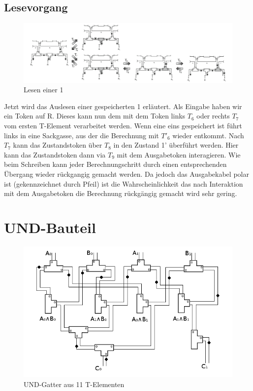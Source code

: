 \documentclass[11pt,a4paper]{article}
\begin{document}
\subsection{Lesevorgang}

\begin{figure}[h]
      \includegraphics[width=14cm]{bilder/read1Mem.png} 
      \caption{Lesen einer 1}
\end{figure}

Jetzt wird das Auslesen einer gespeicherten 1 erläutert.
%
Als Eingabe haben wir ein Token auf R.
%
Dieses kann nun dem mit dem Token links $ T_{6} $ oder rechts $ T_{7} $
vom ersten T-Element verarbeitet werden.
%
Wenn eine eins gespeichert ist führt links in eine Sackgasse, aus der
die Berechnung mit $ T'_{6} $ wieder entkommt.
%
Nach $ T_{7} $ kann das Zustandstoken über $ T_{8} $ in den Zustand 1'
überführt werden. 
%
Hier kann das Zustandstoken dann via $ T_{9} $ mit dem 
Ausgabetoken interagieren.
%
Wie beim Schreiben kann jeder Berechnungschritt durch einen 
entsprechenden Übergang wieder rückgangig gemacht werden.
%
Da jedoch das Ausgabekabel polar ist (gekennzeichnet durch Pfeil)
ist die Wahrscheinlichkeit das nach Interaktion mit dem Ausgabetoken die 
Berechnung rückgängig gemacht wird sehr gering.



\section{UND-Bauteil}

\begin{figure}[h]
    \centering
    \includegraphics[width=12cm]{bilder/UndUnd.png}
    \caption{UND-Gatter aus 11 T-Elementen}
\end{figure}    
\end{document}

